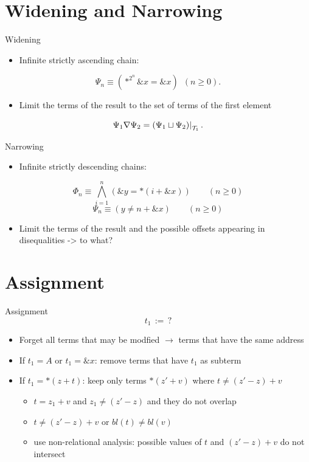 \documentclass{beamer}
\begin{document}
\section{Widening and Narrowing}
\begin{frame}{Widening}
    \begin{itemize}
        \item Infinite strictly ascending chain:
    \end{itemize}
    \[
        \Psi_n \equiv (*^{2^n} \&x = \&x)\hspace{6pt} (n\geq 0).
    \]
    \begin{itemize}
        \item Limit the terms of the result to the set of terms of the first element
    \end{itemize}
    \[\Psi_1 \widen \Psi_2 = \restr{(\Psi_1 \join \Psi_2)}{\T_1}.\]
\end{frame}

\begin{frame}{Narrowing}
    \begin{itemize}
        \item Infinite strictly descending chains:
    \end{itemize}
    \[
        \Phi_n \equiv\bigwedge_{i=1}^n (\&y = *(i+\&x))\qquad(n\geq 0)
    \]
    \[
        \Psi_n \equiv (y\neq n+\&x)\qquad(n\geq 0)
    \]
    \begin{itemize}
        \item Limit the terms of the result and the possible offsets
              appearing in disequalities -> to what?
    \end{itemize}

\end{frame}

\section{Assignment}

\begin{frame}{Assignment}
    \[
        t_1\,{:=}\,?
    \]
    \begin{itemize}
        \item Forget all terms that may be modfied $\rightarrow$ terms that have the same address
        \item If $t_1 = A$ or $t_1 = \&x$: remove terms that have $t_1$ as subterm
        \item If $t_1 = *(z + t)$: keep only terms $*(z' + v)$ where $t \neq (z' - z) + v$
              \begin{itemize}
                  \item $t = z_1 + v$ and $z_1 \neq (z' - z)$ and they do not overlap
                  \item $t \neq (z' - z) + v$ or $bl(t) \neq bl(v)$
                  \item use non-relational analysis: possible values of $t$ and $(z' - z) + v$ do not intersect
              \end{itemize}
    \end{itemize}
\end{frame}
\end{document}
